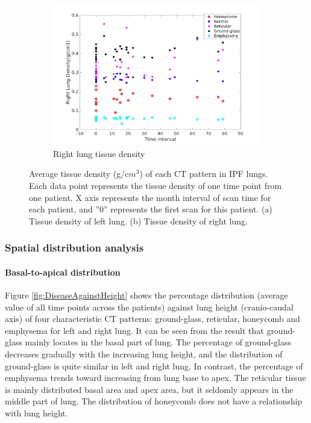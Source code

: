 \begin{figure}[H]
\begin{subfigure}{.7\linewidth}
  \includegraphics[width=\linewidth,trim={{.0\wd0} {.0\wd0} {.0\wd0} {.0\wd0}},clip]{QuantitativeAnalysis/Image/RightLungDensity.jpg}
  \caption{Right lung tissue density}
  \label{fig:LungDensity-b} 
\end{subfigure}
\caption{Average tissue density (g/c$m^3$) of each CT pattern in IPF lungs. Each data point represents the tissue density of one time point from one patient. X axis represents the month interval of scan time for each patient, and ''0'' represents the first scan for this patient. (a) Tissue density of left lung. (b) Tissue density of right lung.}
\label{fig:LungDensity}
\end{figure}

\subsubsection{Spatial distribution analysis}
\paragraph{Basal-to-apical distribution}
Figure \ref{fig:DiseaseAgainstHeight} shows the percentage distribution (average value of all time points across the patients) against lung height (cranio-caudal axis) of four characteristic CT patterns: ground-glass, reticular, honeycomb and emphysema for left and right lung. It can be seen from the result that ground-glass mainly locates in the basal part of lung. The percentage of ground-glass decreases gradually with the increasing lung height, and the distribution of ground-glass is quite similar in left and right lung. In contrast, the percentage of emphysema trends toward increasing from lung base to apex. The reticular tissue is mainly distributed basal area and apex area, but it seldomly appears in the middle part of lung. The distribution of honeycomb does not have a relationship with lung height.

